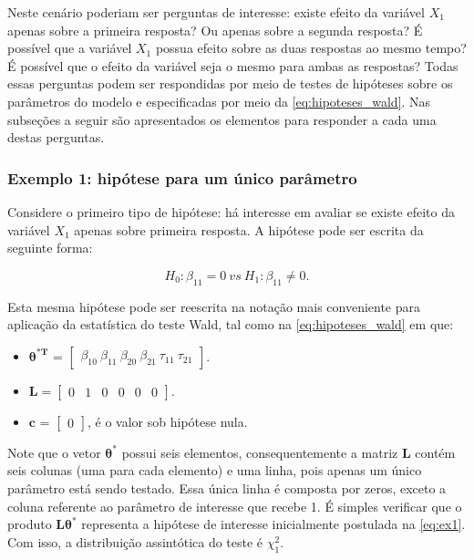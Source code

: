 \documentclass[AMA,STIX1COL]{WileyNJD-v2}
\begin{document}
Neste cenário poderiam ser perguntas de interesse: existe efeito da variável $X_1$ apenas sobre a primeira resposta? Ou apenas sobre a segunda resposta? É possível que a variável $X_1$ possua efeito sobre as duas respostas ao mesmo tempo? É possível que o efeito da variável seja o mesmo para ambas as respostas? Todas essas perguntas podem ser respondidas por meio de testes de hipóteses sobre os parâmetros do modelo e especificadas por meio da \autoref{eq:hipoteses_wald}. Nas subseções a seguir são apresentados os elementos para responder a cada uma destas perguntas. 

\subsubsection{Exemplo 1: hipótese para um único parâmetro}

Considere o primeiro tipo de hipótese: há interesse em avaliar se existe efeito da variável $X_1$ apenas sobre primeira resposta. A hipótese pode ser escrita da seguinte forma:

\begin{equation}
\label{eq:ex1}
H_0: \beta_{11} = 0 \ vs \ H_1: \beta_{11} \neq 0.
\end{equation}

Esta mesma hipótese pode ser reescrita na notação mais conveniente para aplicação da estatística do teste Wald, tal como na \autoref{eq:hipoteses_wald} em que:

\begin{itemize}
  
  \item $\boldsymbol{\theta^{*T}}$ = $\begin{bmatrix} \beta_{10} \  \beta_{11} \ \beta_{20} \ \beta_{21} \ \tau_{11} \ \tau_{21} \end{bmatrix}$.

\item $\boldsymbol{L} = \begin{bmatrix} 0 & 1 & 0 & 0 & 0 & 0  \end{bmatrix}.$
 
\item $\boldsymbol{c}$ = $\begin{bmatrix} 0 \end{bmatrix}$, é o valor sob hipótese nula. 
\end{itemize}

Note que o vetor $\boldsymbol{\theta^{*}}$ possui seis elementos, consequentemente a matriz $\boldsymbol{L}$ contém seis colunas (uma para cada elemento) e uma linha, pois apenas um único parâmetro está sendo testado. Essa única linha é composta por zeros, exceto a coluna referente ao parâmetro de interesse que recebe 1. É simples verificar que o produto $\boldsymbol{L}\boldsymbol{\theta^{*}}$ representa a hipótese de interesse inicialmente postulada na \autoref{eq:ex1}. Com isso, a distribuição assintótica do teste é $\chi^2_1$.
\end{document}
